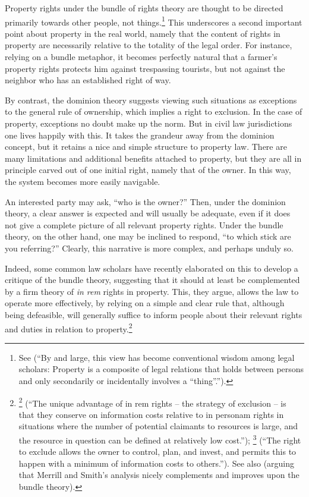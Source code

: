 Property rights under the bundle of rights theory are thought to be directed primarily towards other people, not things.\footnote{See \cite[357-358]{merrill01} (``By and large, this view has become conventional wisdom among legal scholars: Property is a composite of legal relations that holds between persons and only secondarily or incidentally involves a ``thing''.'').} This underscores a second important point about property in the real world, namely that the content of rights in property are necessarily relative to the totality of the legal order. For instance, relying on a bundle metaphor, it becomes perfectly natural that a farmer's property rights protects him against trespassing tourists, but not against the neighbor who has an established right of way. 

By contrast, the dominion theory suggests viewing such situations as exceptions to the general rule of ownership, which implies a right to exclusion. In the case of property, exceptions no doubt make up the norm. But in civil law jurisdictions one lives happily with this. It takes the grandeur away from the dominion concept, but it retains a nice and simple structure to property law. There are many limitations and additional benefits attached to property, but they are all in principle carved out of one initial right, namely that of the owner. In this way, the system becomes more easily navigable.

An interested party may ask, ``who is the owner?'' Then, under the dominion theory, a clear answer is expected and will usually be adequate, even if it does not give a complete picture of all relevant property rights. Under the bundle theory, on the other hand, one may be inclined to respond, ``to which stick are you referring?'' Clearly, this narrative is more complex, and perhaps unduly so. 

Indeed, some common law scholars have recently elaborated on this to develop a critique of the bundle theory, suggesting that it should at least be complemented by a firm theory of {\it in rem} rights in property. This, they argue, allows the law to operate more effectively, by relying on a simple and clear rule that, although being defeasible, will generally suffice to inform people about their relevant rights and duties in relation to property.\footnote{\footcite[793]{merrill01b} (``The unique advantage of in rem rights -- the strategy of exclusion -- is that they conserve on information costs relative to in personam rights in situations where the number of potential claimants to resources is large, and the resource in question can be defined at relatively low cost.''); \footcite[389]{merrill01} (``The right to exclude allows the owner to control, plan, and invest, and permits this to happen with a minimum of information costs to others.''). See also \cite{ellickson11} (arguing that Merrill and Smith's analysis nicely complements and improves upon the bundle theory).} 

